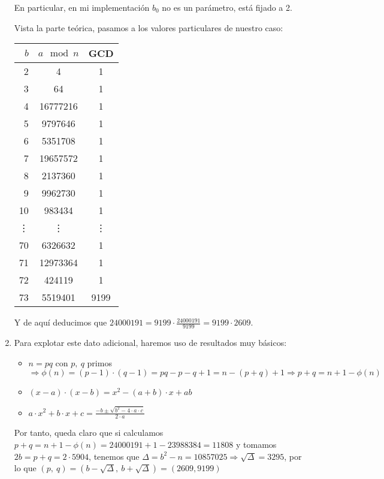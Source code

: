 \begin{enumerate}
		En particular, en mi implementación $b_0$ no es un parámetro, está fijado a 2.
		
		Vista la parte teórica, pasamos a los valores particulares de nuestro caso:
		\begin{center}
		\begin{tabular}{ | r | c | c |}
			\hline
			$b$     & $a \mod n$    & GCD \\
			\hline
			2       &  4            &  1  \\
			3       &  64           &  1  \\
			4       &  16777216     &  1  \\
			5       &  9797646      &  1  \\
			6       &  5351708      &  1  \\
			7       &  19657572     &  1  \\
			8       &  2137360      &  1  \\
			9       &  9962730      &  1  \\
			10      &  983434       &  1  \\
			\vdots  &  \vdots       &  \vdots  \\
			70      &  6326632      &  1  \\
			71      &  12973364     &  1  \\
			72      &  424119       &  1  \\
			73      &  5519401      &  9199  \\
			\hline
		\end{tabular}
		\end{center}
		
		Y de aquí deducimos que $\displaystyle 24000191 = 9199 \cdot \frac{24000191}{9199} = 9199 \cdot 2609$.
		
		\item Para explotar este dato adicional, haremos uso de resultados muy básicos:
		\begin{itemize}
			\item $n = pq$ con $p,\ q$ primos $\Rightarrow \phi(n) = (p-1) \cdot (q-1) = pq -p -q +1 = n -(p+q) +1
			\Rightarrow p+q = n+1-\phi(n)$
			\item $(x-a) \cdot (x-b) = x^2 -(a+b) \cdot x + ab$
			\item $\displaystyle a \cdot x^2 + b \cdot x + c = \frac{-b \pm \sqrt{b^2 - 4 \cdot a \cdot c}}{2 \cdot a}$
		\end{itemize}
		
		Por tanto, queda claro que si calculamos $p+q = n+1-\phi(n) = 24000191+1-23988384 = 11808$ y tomamos $2b = p+q =
		2 \cdot 5904$, tenemos que $\Delta = b^2-n = 10857025 \Rightarrow \sqrt{\Delta} = 3295$, por lo que $(p,\ q) =
		\left(b-\sqrt{\Delta},\ b+\sqrt{\Delta}\right) = (2609, 9199)$
	\end{enumerate}
